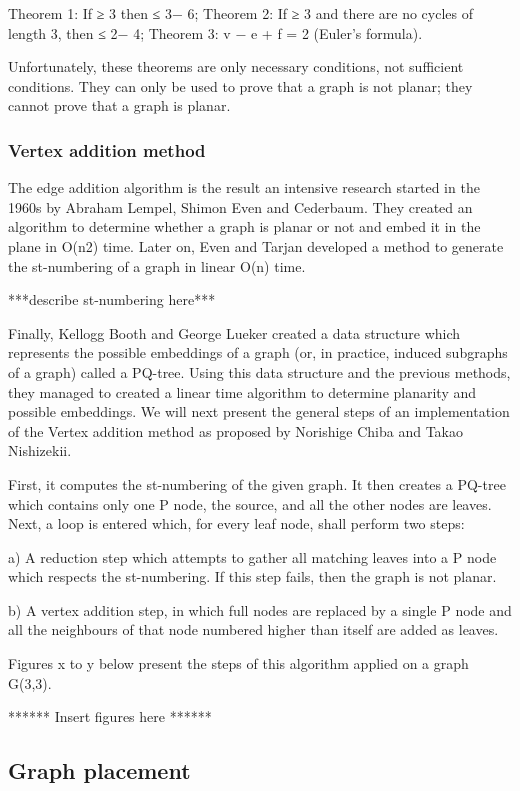 Theorem 1: If \iv ≥ 3 then \ie ≤ 3\iv − 6;
Theorem 2: If \iv ≥ 3 and there are no cycles of length 3, then \ie ≤ 2\iv − 4;
Theorem 3: v − e + f = 2 (Euler's formula).

Unfortunately, these theorems are only necessary conditions, not sufficient conditions. They can only be used to 
prove that a graph is not planar; they cannot prove that a graph is planar.

\subsubsection{Vertex addition method}

The edge addition algorithm is the result an intensive research started in the 1960s by Abraham Lempel, Shimon Even
and Cederbaum. They created an algorithm to determine whether a graph is planar or not and embed it in the plane in 
O(n2) time. Later on, Even and Tarjan developed a method to generate the st-numbering of a graph in linear O(n) time.

***describe st-numbering here***

Finally, Kellogg Booth and George Lueker created a data structure which represents the possible embeddings of a graph 
(or, in practice, induced subgraphs of a graph) called a PQ-tree. Using this data structure and the previous methods, 
they managed to created a linear time algorithm to determine planarity and possible embeddings. We will next present 
the general steps of an implementation of the Vertex addition method as proposed by Norishige Chiba and Takao Nishizekii.

First, it computes the st-numbering of the given graph. It then creates a PQ-tree which contains only one P node, the 
source, and all the other nodes are leaves. Next, a loop is entered which, for every leaf node, shall perform two steps:

a) A reduction step which attempts to gather all matching leaves into a P node which respects the st-numbering. If this 
step fails, then the graph is not planar.

b) A vertex addition step, in which full nodes are replaced by a single P node and all the neighbours of that node 
numbered higher than itself are added as leaves.

Figures x to y below present the steps of this algorithm applied on a graph G(3,3).

****** Insert figures here ******


\subsection{Graph placement}

